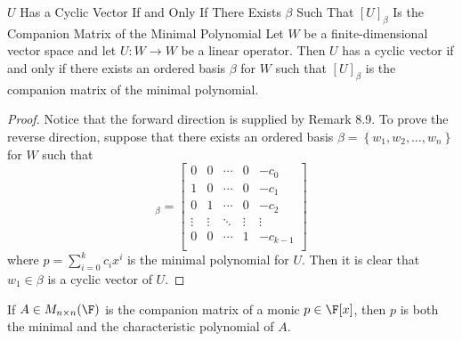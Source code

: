 \documentclass[linearalgebra]{subfiles}
\begin{document}
    \clearpage
    \begin{theorem}{$U$ Has a Cyclic Vector If and Only If There Exists $\beta$ Such That $[U]_\beta$ Is the Companion Matrix of the Minimal Polynomial}
        Let $W$ be a finite-dimensional vector space and let $U:W\to W$ be a linear operator. Then $U$ has a cyclic vector if and only if there exists an ordered basis $\beta$ for $W$ such that $[U]_\beta$ is the companion matrix of the minimal polynomial.
    \end{theorem}

    \begin{proof}
        Notice that the forward direction is supplied by Remark 8.9. To prove the reverse direction, suppose that there exists an ordered basis $\beta = \left\lbrace w_1, w_2,\ldots, w_n \right\rbrace $ for $W$ such that
        \begin{equation*}
            [U]_\beta =
            \begin{bmatrix}
                0 & 0 & \cdots & 0 & -c_0 \\
                1 & 0 & \cdots & 0 & -c_1 \\
                0 & 1 & \cdots & 0 & -c_2 \\
                \vdots & \vdots & \ddots  & \vdots & \vdots \\
                0 & 0 & \cdots & 1 & -c_{k-1} \\
            \end{bmatrix}
        \end{equation*}
        where $p = \sum^{k}_{i=0} c_ix^i$ is the minimal polynomial for $U$. Then it is clear that $w_1\in\beta$ is a cyclic vector of $U$.
    \end{proof}

    \begin{cor}{}
        If $A\in M_{n\times n}(\F)$ is the companion matrix of a monic $p\in\F[x]$, then $p$ is both the minimal and the characteristic polynomial of $A$.
    \end{cor}	
\end{document}
